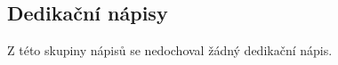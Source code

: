 
\subsection[dedikační-nápisy-2]{Dedikační nápisy}

Z této skupiny nápisů se nedochoval žádný dedikační nápis.

